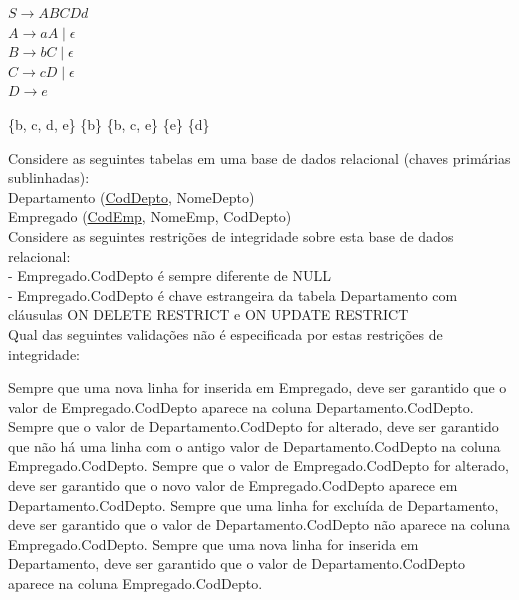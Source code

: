 \documentclass[12pt, addpoints]{exam}
\begin{document}
\begin{questions}
$S \rightarrow ABCDd$\\

$A \rightarrow aA \mid \epsilon$\\

$B \rightarrow bC \mid \epsilon$\\

$C \rightarrow cD \mid \epsilon$\\

$D \rightarrow e$\\
\begin{choices}
\choice \{b, c, d, e\}
\choice \{b\}
\choice \{b, c, e\}
\choice \{e\}
\choice \{d\}
\end{choices}

\question

Considere as seguintes tabelas em uma base de dados relacional (chaves primárias sublinhadas):\\

Departamento (\underline{CodDepto}, NomeDepto)\\

Empregado (\underline{CodEmp}, NomeEmp, CodDepto)\\

Considere as seguintes restrições de integridade sobre esta base de dados relacional:\\

- Empregado.CodDepto é sempre diferente de NULL\\

- Empregado.CodDepto é chave estrangeira da tabela Departamento com cláusulas ON DELETE RESTRICT e ON UPDATE RESTRICT\\

Qual das seguintes validações não é especificada por estas restrições de integridade:
\begin{choices}
\choice Sempre que uma nova linha for inserida em Empregado, deve ser garantido que o valor de Empregado.CodDepto aparece na coluna Departamento.CodDepto.
\choice Sempre que o valor de Departamento.CodDepto for alterado, deve ser garantido que não há uma linha com o antigo valor de Departamento.CodDepto na coluna Empregado.CodDepto.
\choice Sempre que o valor de Empregado.CodDepto for alterado, deve ser garantido que o novo valor de Empregado.CodDepto aparece em Departamento.CodDepto.
\choice Sempre que uma linha for excluída de Departamento, deve ser garantido que o valor de Departamento.CodDepto não aparece na coluna Empregado.CodDepto.
\choice Sempre que uma nova linha for inserida em Departamento, deve ser garantido que o valor de Departamento.CodDepto aparece na coluna Empregado.CodDepto.
\end{choices}


\end{questions}
\end{document}
